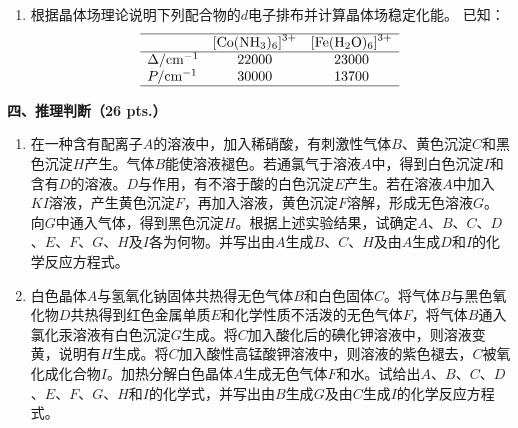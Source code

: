 \begin{enumerate}[label=\arabic*., start=1, itemsep=1.5ex]
\[\begin{array}{ll}
    \end{array}
    \]
    计算电池反应  的电动势 $E^\ominus$。
    \item 根据晶体场理论说明下列配合物的$d$电子排布并计算晶体场稳定化能。
    已知：
    \[
    \begin{array}{lcc}
    \hline
     & \ce{[Co(NH3)6]^{3+}} & \ce{[Fe(H2O)6]^{3+}} \\
    \hline
    \Delta/\text{cm}^{-1} & 22000 & 23000 \\
    P/\text{cm}^{-1} & 30000 & 13700 \\
    \hline
    \end{array}
    \]

\end{enumerate}

\vspace{0.5cm}
\noindent\textbf{四、推理判断（26 pts.）}

\begin{enumerate}[label=\arabic*., start=1, itemsep=1.5ex]
    \item 在一种含有配离子$A$的溶液中，加入稀硝酸，有刺激性气体$B$、黄色沉淀$C$和黑色沉淀$H$产生。气体$B$能使溶液褪色。若通氯气于溶液$A$中，得到白色沉淀$I$和含有$D$的溶液。$D$与作用，有不溶于酸的白色沉淀$E$产生。若在溶液$A$中加入$KI$溶液，产生黄色沉淀$F$，再加入溶液，黄色沉淀$F$溶解，形成无色溶液$G$。向$G$中通入气体，得到黑色沉淀$H$。根据上述实验结果，试确定$A$、$B$、$C$、$D$、$E$、$F$、$G$、$H$及$I$各为何物。并写出由$A$生成$B$、$C$、$H$及由$A$生成$D$和$I$的化学反应方程式。
    \item 白色晶体$A$与氢氧化钠固体共热得无色气体$B$和白色固体$C$。将气体$B$与黑色氧化物$D$共热得到红色金属单质$E$和化学性质不活泼的无色气体$F$，将气体$B$通入氯化汞溶液有白色沉淀$G$生成。将$C$加入酸化后的碘化钾溶液中，则溶液变黄，说明有$H$生成。将$C$加入酸性高锰酸钾溶液中，则溶液的紫色褪去，$C$被氧化成化合物$I$。加热分解白色晶体$A$生成无色气体$F$和水。试给出$A$、$B$、$C$、$D$、$E$、$F$、$G$、$H$和$I$的化学式，并写出由$B$生成$G$及由$C$生成$I$的化学反应方程式。
\end{enumerate}